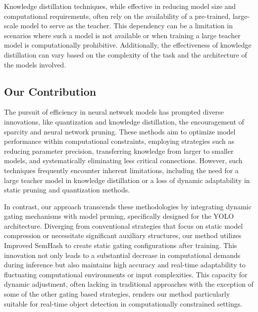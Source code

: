 Knowledge distillation techniques, while effective in reducing model size and computational requirements, often rely on the availability of a pre-trained, large-scale model to serve as the teacher. This dependency can be a limitation in scenarios where such a model is not available or when training a large teacher model is computationally prohibitive. Additionally, the effectiveness of knowledge distillation can vary based on the complexity of the task and the architecture of the models involved. 

\subsection{Our Contribution}

The pursuit of efficiency in neural network models has prompted diverse innovations, like quantization and knowledge distillation, the encouragement of sparcity and neural network pruning. These methods aim to optimize model performance within computational constraints, employing strategies such as reducing parameter precision, transferring knowledge from larger to smaller models, and systematically eliminating less critical connections. However, such techniques frequently encounter inherent limitations, including the need for a large teacher model in knowledge distillation or a loss of dynamic adaptability in static pruning and quantization methods.

In contrast, our approach transcends these methodologies by integrating dynamic gating mechanisms with model pruning, specifically designed for the YOLO architecture. Diverging from conventional strategies that focus on static model compression or necessitate significant auxiliary structures, our method utilizes Improved SemHash to create static gating configurations after training. This innovation not only leads to a substantial decrease in computational demands during inference but also maintains high accuracy and real-time adaptability to fluctuating computational environments or input complexities. This capacity for dynamic adjustment, often lacking in traditional approaches with the exception of some of the other gating based strategies, renders our method particularly suitable for real-time object detection in computationally constrained settings.


